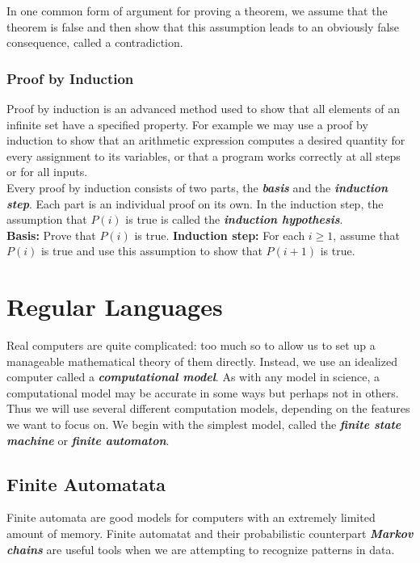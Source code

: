 \documentclass{article}
\theoremstyle{definition}
\newcommand{\bold}[1]{\textbf{#1}}
\newcommand{\define}[1]{\textbf{\textit{#1}}}
\begin{document}
In one common form of argument for proving a theorem, we assume that the theorem is false and then show that this assumption leads to an obviously false consequence, called a contradiction. 

\subsubsection{Proof by Induction}

Proof by induction is an advanced method used to show that all elements of an infinite set have a specified property. For example we may use a proof by induction to show that an arithmetic expression computes a desired quantity for every assignment to its variables, or that a program works correctly at all steps or for all inputs. \\ 

Every proof by induction consists of two parts, the \define{basis} and the \define{induction step}. Each part is an individual proof on its own. In the induction step, the assumption that $P(i)$ is true is called the \define{induction hypothesis}. \\

\bold{Basis:} Prove that $P(i)$ is true. 
\bold{Induction step:} For each $i \geq 1$, assume that $P(i)$ is true and use this assumption to show that $P(i+1)$ is true. \\ 

\section{Regular Languages}

Real computers are quite complicated: too much so to allow us to set up a manageable mathematical theory of them directly. Instead, we use an idealized computer called a \define{computational model}. As with any model in science, a computational model may be accurate in some ways but perhaps not in others. Thus we will use several different computation models, depending on the features we want to focus on. We begin with the simplest model, called the \define{finite state machine} or \define{finite automaton}. 

\subsection{Finite Automatata}

Finite automata are good models for computers with an extremely limited amount of memory. Finite automatat and their probabilistic counterpart \define{Markov chains} are useful tools when we are attempting to recognize patterns in data. \\ 
\end{document}
